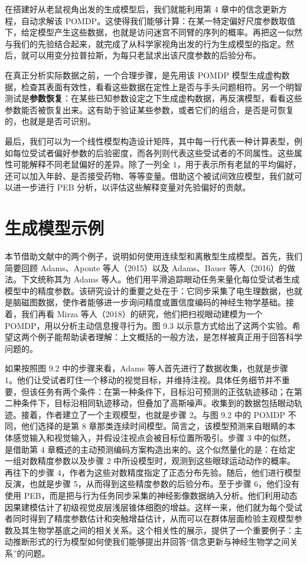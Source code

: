 在搭建好从老鼠视角出发的生成模型后，我们就能利用第 4 章中的信念更新方程，自动求解该 POMDP。这使得我们能够计算：在某一特定偏好尺度参数取值下，给定模型产生这些数据，也就是访问迷宫不同臂的序列的概率。再把这一似然与我们的先验结合起来，就完成了从科学家视角出发的行为生成模型的指定。然后，就可以用变分拉普拉斯，为每只老鼠求出该尺度参数的后验分布。

在真正分析实际数据之前，一个合理步骤，是先用该 POMDP 模型生成虚构数据，检查其表面有效性，看看这些数据在定性上是否与手头问题相符。另一个明智测试是\textbf{参数恢复}：在某些已知参数设定之下生成虚构数据，再反演模型，看看这些参数能否被恢复出来。这有助于验证某些参数，或者它们的组合，是否是可恢复的，也就是是否可识别。

最后，我们可以为一个线性模型构造设计矩阵，其中每一行代表一种计算表型，例如每位受试者偏好参数的后验密度，而各列则代表这些受试者的不同属性。这些属性可能解释不同老鼠偏好的差异。除了一列全 $1$，用于表示所有老鼠的平均偏好，还可以加入年龄、是否接受药物、等等变量。借助这个被试间效应模型，我们就可以进一步进行 PEB 分析，以评估这些解释变量对先验偏好的贡献。

\section{生成模型示例}

本节借助文献中的两个例子，说明如何使用连续型和离散型生成模型。首先，我们简要回顾 Adams、Aponte 等人（2015）以及 Adams、Bauer 等人（2016）的做法。下文统称其为 Adams 等人。他们用平滑追踪眼动任务来量化每位受试者生成模型中的精度参数。该研究设计的重要之处在于：它同步采集了电生理数据，也就是脑磁图数据，使作者能够进一步询问精度或置信度编码的神经生物学基础。接着，我们再看 Mirza 等人（2018）的研究，他们把扫视眼动建模为一个 POMDP，用以分析主动信息搜寻行为。图 9.3 以示意方式给出了这两个实验。希望这两个例子能帮助读者理解：上文概括的一般方法，是怎样被真正用于回答科学问题的。

如果按照图 9.2 中的步骤来看，Adams 等人首先进行了数据收集，也就是步骤 1。他们让受试者盯住一个移动的视觉目标，并维持注视。具体任务细节并不重要，但该任务有两个条件：在第一种条件下，目标沿可预测的正弦轨迹移动；在第二种条件下，目标沿相同轨迹移动，但叠加了高斯噪声。收集到的数据包括眼动轨迹。接着，作者建立了一个主观模型，也就是步骤 2。与图 9.2 中的 POMDP 不同，他们选择的是第 8 章那类连续时间模型。简言之，该模型预测来自眼睛的本体感觉输入和视觉输入，并假设注视点会被目标位置所吸引。步骤 3 中的似然，是借助第 4 章概述的主动预测编码方案构造出来的。这个似然量化的是：在给定一组对数精度参数以及步骤 2 中所设模型时，观测到这些眼球运动动作的概率。再往下的步骤 4，作者为这些对数精度指定了正态分布先验。随后，他们进行模型反演，也就是步骤 5，从而得到这些精度参数的后验分布。至于步骤 6，他们没有使用 PEB，而是把与行为任务同步采集的神经影像数据纳入分析。他们利用动态因果建模估计了初级视觉皮层浅层锥体细胞的增益。这样一来，他们就为每个受试者同时得到了精度参数估计和突触增益估计，从而可以在群体层面检验主观模型参数及其生物学基底之间的相关关系。这个相关性的展示，提供了一个重要例子：主动推断形式的行为模型如何使我们能够提出并回答“信念更新与神经生物学之间关系”的问题。

